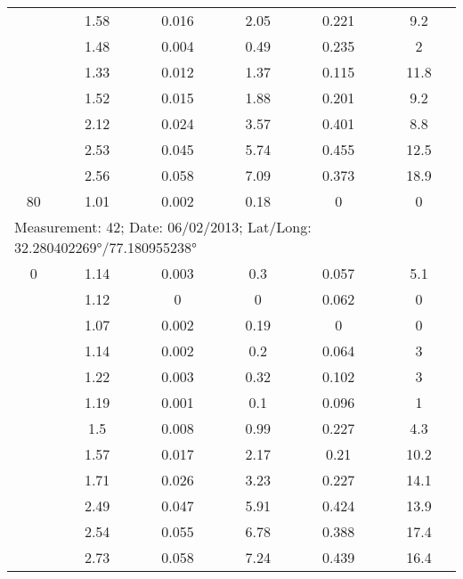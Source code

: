 \begin{longtable}{cccccc}
		& 1.58  & 0.016 & 2.05  & 0.221 & 9.2 \\
		
		& 1.48  & 0.004 & 0.49  & 0.235 & 2 \\
		
		& 1.33  & 0.012 & 1.37  & 0.115 & 11.8 \\
		
		& 1.52  & 0.015 & 1.88  & 0.201 & 9.2 \\
		
		& 2.12  & 0.024 & 3.57  & 0.401 & 8.8 \\
		
		& 2.53  & 0.045 & 5.74  & 0.455 & 12.5 \\
		
		& 2.56  & 0.058 & 7.09  & 0.373 & 18.9 \\
		
		80    & 1.01  & 0.002 & 0.18  & 0     & 0 \\
		\midrule
		\multicolumn{6}{l}{Measurement: 42; Date: 06/02/2013;
			Lat/Long: 32.280402269°/77.180955238°} \\	
		\midrule 		
		0     & 1.14  & 0.003 & 0.3   & 0.057 & 5.1 \\
		
		& 1.12  & 0     & 0     & 0.062 & 0 \\
		
		& 1.07  & 0.002 & 0.19  & 0     & 0 \\
		
		& 1.14  & 0.002 & 0.2   & 0.064 & 3 \\
		
		& 1.22  & 0.003 & 0.32  & 0.102 & 3 \\
		
		& 1.19  & 0.001 & 0.1   & 0.096 & 1 \\
		
		& 1.5   & 0.008 & 0.99  & 0.227 & 4.3 \\
		
		& 1.57  & 0.017 & 2.17  & 0.21  & 10.2 \\
		
		& 1.71  & 0.026 & 3.23  & 0.227 & 14.1 \\
		
		& 2.49  & 0.047 & 5.91  & 0.424 & 13.9 \\
		
		& 2.54  & 0.055 & 6.78  & 0.388 & 17.4 \\
		
		& 2.73  & 0.058 & 7.24  & 0.439 & 16.4 \\
		

\end{longtable}
